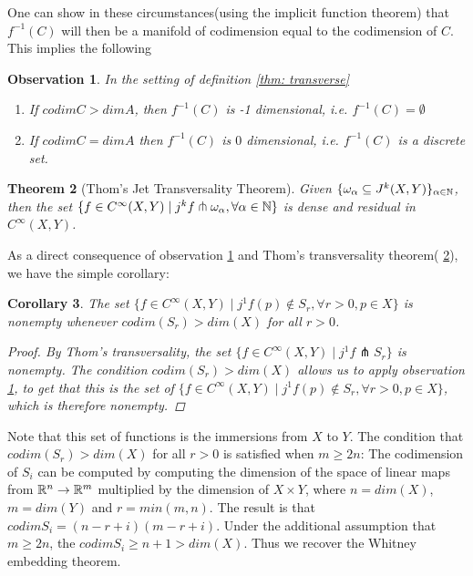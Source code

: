 \documentclass{article}
\newtheorem{theorem}{Theorem}[section]
\newtheorem{corollary}[theorem]{Corollary}
\newtheorem{proposed work}[theorem]{Proposed Work}
\newtheorem{observation}[theorem]{Observation}
\begin{document}
One can show in these circumstances(using the implicit function theorem) that $f^{-1}(C)$ will then be a manifold of codimension equal to the codimension of $C$.  This implies the following

\begin{observation}\label{thm: dimensioncounting}
In the setting of definition \ref{thm: transverse}
\begin{enumerate}
\item If $codim C > dim A $, then $f^{-1}(C)$ is -1 dimensional, i.e. $f^{-1}(C)= \emptyset$
\item If $codim C  = dim A$ then $f^{-1}(C)$ is $0$ dimensional, i.e. $f^{-1}(C)$ is a discrete set.
\end{enumerate}
\end{observation}

\begin{theorem}[Thom's Jet Transversality Theorem]\label{thm: thomJT}
Given $\{\omega_\alpha \subseteq J^k(X,Y)\}_{\alpha \in \mathbb N}$, then the set $\{f \in C^\infty(X,Y) \mid j^kf \pitchfork \omega_\alpha, \forall \alpha \in \mathbb N\}$ is dense and residual in $C^\infty(X,Y)$.
\end{theorem}


As a direct consequence of observation \ref{thm: dimensioncounting} and Thom's transversality theorem( \ref{thm: thomJT}), we have the simple corollary:

\begin{corollary}\label{thm:jettransimm}
The set $\{f \in C^\infty(X,Y) \mid j^1f(p) \notin  S_r, \forall r>0, p \in X \}$ is nonempty whenever $codim(S_r) > dim(X)$ for all $r>0$. 
\begin{proof}
By Thom's transversality, the set $\{ f \in C^\infty(X,Y) \mid j^1f  \pitchfork S_r \}$ is nonempty.  The condition $codim(S_r) > dim(X)$ allows us to apply observation \ref{thm: dimensioncounting}, to get that this is the set of $\{f \in C^\infty(X,Y) \mid j^1f(p) \notin  S_r, \forall r>0, p \in X \}$, which is therefore nonempty.
\end{proof}

\end{corollary}
Note that this set of functions is the immersions from $X$ to $Y$.  The condition that $codim(S_r) > dim(X)$ for all $r>0$ is satisfied when $m \geq 2n$:
The codimension of $S_i$ can be computed by computing the dimension of the space of linear maps \label{howcomputedimension} from $\mathbb R^n \to \mathbb R^m$ multiplied by the dimension of $X \times Y$, where $n=dim(X)$, $m=dim(Y)$ and $r=min(m,n)$.  The result is that $codim S_i=(n-r+i)(m-r+i)$. Under the additional assumption that $m \geq 2n$, the $codim S_i \geq n+1> dim(X)$.  Thus we recover the Whitney embedding theorem.
\end{document}
